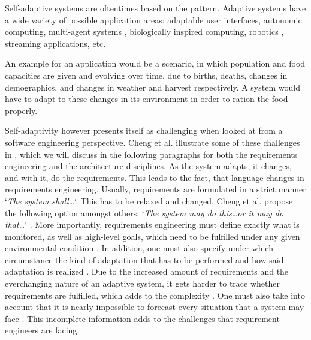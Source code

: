     \quad Self-adaptive systems are oftentimes based on the  pattern.
    Adaptive systems have a wide variety of possible application areas: adaptable user interfaces, autonomic computing, multi-agent systems \cite{Cheng:2009:SES:1573856.1573858}, 
    biologically inspired computing, robotics \cite{10.1007/978-3-319-59480-4_44}, streaming applications, etc.

    \quad An example for an application would be a scenario, in which population and food capacities are given and evolving over time, due to births, deaths, changes in demographics, 
    and changes in weather and harvest respectively. A system would have to adapt to these changes in its environment in order to ration the food properly.

    \quad Self-adaptivity however presents itself as challenging when looked at from a software engineering perspective.
    Cheng et al. illustrate some of these challenges in \cite{Cheng:2009:SES:1573856.1573858}, which we will discuss in the following paragraphs for both the 
    requirements engineering and the architecture disciplines.
    As the system adapts, it changes, and with it, do the requirements. This leads to the fact, that language changes in requirements engineering.
    Usually, requirements are formulated in a strict manner `\textit{The system shall\ldots}`. This has to be relaxed and changed, Cheng et al. propose the following 
    option amongst others: `\textit{The system may do this\ldots or it may do that\ldots}` \cite[p. 10 f.]{Cheng:2009:SES:1573856.1573858}.
    More importantly, requirements engineering must define exactly what is monitored, as well as high-level goals, which need to be fulfilled under any given environmental condition \cite[p. 9]{Cheng:2009:SES:1573856.1573858}.
    In addition, one must also specify under which circumstance the kind of adaptation that has to be performed and how said adaptation is realized \cite[p. 9]{Cheng:2009:SES:1573856.1573858}.
    Due to the increased amount of requirements and the everchanging nature of an adaptive system, it gets harder to trace whether requirements are fulfilled, which adds to the complexity \cite[p. 12]{Cheng:2009:SES:1573856.1573858}.
    One must also take into account that it is nearly impossible to forecast every situation that a system may face \cite[p. 9]{Cheng:2009:SES:1573856.1573858}. 
    This incomplete information adds to the challenges that requirement engineers are facing.


